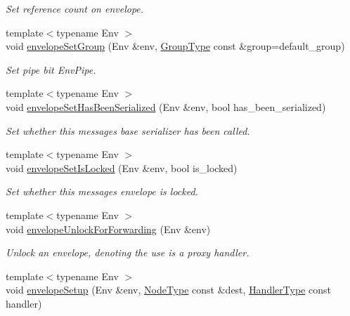 \begin{DoxyCompactItemize}
\begin{DoxyCompactList}\small\item\em Set reference count on envelope. \end{DoxyCompactList}\item 
{\footnotesize template$<$typename Env $>$ }\\void \hyperlink{namespacevt_a9f9d4ce6034c0eaaf98bdffd33d0e1c7}{envelope\+Set\+Group} (Env \&env, \hyperlink{namespacevt_a27b5e4411c9b6140c49100e050e2f743}{Group\+Type} const \&group=default\+\_\+group)
\begin{DoxyCompactList}\small\item\em Set pipe bit {\ttfamily Env\+Pipe}. \end{DoxyCompactList}\item 
{\footnotesize template$<$typename Env $>$ }\\void \hyperlink{namespacevt_a32c449c2c4c6e0806cdab6798e275c03}{envelope\+Set\+Has\+Been\+Serialized} (Env \&env, bool has\+\_\+been\+\_\+serialized)
\begin{DoxyCompactList}\small\item\em Set whether this message\textquotesingle{}s base serializer has been called. \end{DoxyCompactList}\item 
{\footnotesize template$<$typename Env $>$ }\\void \hyperlink{namespacevt_aeda768e2b7668340d73e5254a6b2923f}{envelope\+Set\+Is\+Locked} (Env \&env, bool is\+\_\+locked)
\begin{DoxyCompactList}\small\item\em Set whether this message\textquotesingle{}s envelope is locked. \end{DoxyCompactList}\item 
{\footnotesize template$<$typename Env $>$ }\\void \hyperlink{namespacevt_af3b1b3751353bac014e08070383062e9}{envelope\+Unlock\+For\+Forwarding} (Env \&env)
\begin{DoxyCompactList}\small\item\em Unlock an envelope, denoting the use is a proxy handler. \end{DoxyCompactList}\item 
{\footnotesize template$<$typename Env $>$ }\\void \hyperlink{namespacevt_a28259c2647b43612398b9355a3e1916c}{envelope\+Setup} (Env \&env, \hyperlink{namespacevt_a866da9d0efc19c0a1ce79e9e492f47e2}{Node\+Type} const \&dest, \hyperlink{namespacevt_af64846b57dfcaf104da3ef6967917573}{Handler\+Type} const handler)

\end{DoxyCompactItemize}
